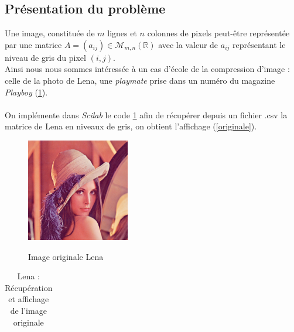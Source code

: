 \documentclass[a4paper,10pt]{report}
\begin{document}
\subsection{Présentation du problème}
\begin{minipage}[c]{.70\linewidth}
\indent Une image, constituée de $m$ lignes et $n$ colonnes de pixels peut-être représentée par une matrice $A = (a_{ij}) \in \mathcal{M}_{m,n}(\mathbb{R})$ avec la valeur de $a_{ij}$ représentant le niveau de gris du pixel $(i,j)$.\\
\indent Ainsi nous nous sommes intéressée à un cas d'école de la compression d'image : celle de la photo de Lena, une \textit{playmate} prise dans un numéro du magazine \textit{Playboy} (\ref{lena_couleur}). \\ \\
\indent On implémente dans \textit{Scilab} le code \ref{lena_originale} afin de récupérer depuis un fichier .csv la matrice de Lena en niveaux de gris, on obtient l'affichage (\ref{originale}).
\end{minipage} \hfill
\begin{minipage}[c]{.05\linewidth}
\end{minipage} \hfill
\begin{minipage}[c]{.21\linewidth}
	\begin{figure}[H]
	\centering
	\caption{Image originale Lena}
	\includegraphics[width=4.5cm]{lena.png}
	\label{lena_couleur}
	\end{figure}
\end{minipage}

\begin{table}[H]
\caption{Lena : Récupération et affichage de l'image originale}
\begin{tabular}{l}

\label{lena_originale}
\end{tabular}
\end{table}
\end{document}
